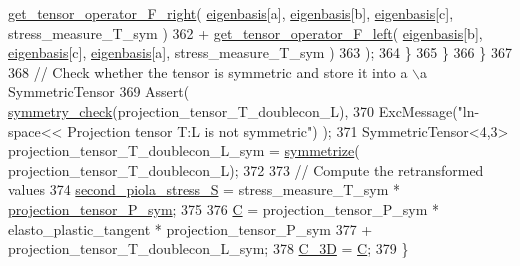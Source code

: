 \begin{DoxyCode}
      \hyperlink{functions_8h_acfd8da38df3766246f7bcf0e736ad9f4}{get\_tensor\_operator\_F\_right}( \hyperlink{classln__space_a1e67221edabbd2db69aa4a21262bd1f4}{eigenbasis}[a], 
      \hyperlink{classln__space_a1e67221edabbd2db69aa4a21262bd1f4}{eigenbasis}[b], \hyperlink{classln__space_a1e67221edabbd2db69aa4a21262bd1f4}{eigenbasis}[c], stress\_measure\_T\_sym )
362                                                                 + 
      \hyperlink{functions_8h_a6f9435c7728281851248d3537c100e7d}{get\_tensor\_operator\_F\_left}(  \hyperlink{classln__space_a1e67221edabbd2db69aa4a21262bd1f4}{eigenbasis}[b], 
      \hyperlink{classln__space_a1e67221edabbd2db69aa4a21262bd1f4}{eigenbasis}[c], \hyperlink{classln__space_a1e67221edabbd2db69aa4a21262bd1f4}{eigenbasis}[a], stress\_measure\_T\_sym )
363                                                               );
364                     \}
365             \}
366      \}
367 
368     \textcolor{comment}{// Check whether the tensor is symmetric and store it into a \(\backslash\)a SymmetricTensor}
369      Assert( \hyperlink{functions_8h_aa37f13547b984cb066e2fcb530b36425}{symmetry\_check}(projection\_tensor\_T\_doublecon\_L),
370                   ExcMessage(\textcolor{stringliteral}{"ln-space<< Projection tensor T:L is not symmetric"}) );
371      SymmetricTensor<4,3> projection\_tensor\_T\_doublecon\_L\_sym = \hyperlink{functions_8h_afe83e9509497294b7f662b800b6b91ff}{symmetrize}(
      projection\_tensor\_T\_doublecon\_L);
372 
373     \textcolor{comment}{// Compute the retransformed values}
374      \hyperlink{classln__space_a9827f6c10219014445a328c9972f89f7}{second\_piola\_stress\_S} = stress\_measure\_T\_sym * 
      \hyperlink{classln__space_a514a44d8b96a0cffeab11d39933299b5}{projection\_tensor\_P\_sym};
375 
376      \hyperlink{classln__space_a03b61855dbad8c954ace5700ee4a3769}{C} = projection\_tensor\_P\_sym * elasto\_plastic\_tangent * projection\_tensor\_P\_sym
377                               + projection\_tensor\_T\_doublecon\_L\_sym;
378      \hyperlink{classln__space_a73ba46c443138c59b8eaa1c4561b7dc6}{C\_3D} = \hyperlink{classln__space_a03b61855dbad8c954ace5700ee4a3769}{C};
379 \}
\end{DoxyCode}
